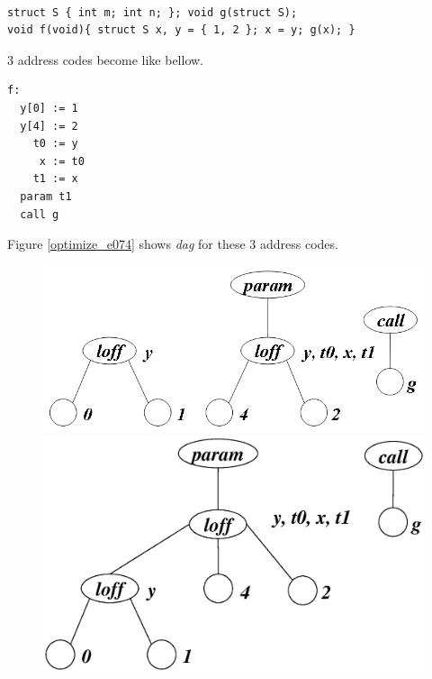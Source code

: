 \begin{Example}
\label{optimize_e073}
\begin{verbatim}

struct S { int m; int n; }; void g(struct S);
void f(void){ struct S x, y = { 1, 2 }; x = y; g(x); }
\end{verbatim}
3 address codes become like bellow.
\begin{verbatim}
f:
  y[0] := 1
  y[4] := 2
    t0 := y
     x := t0
    t1 := x
  param t1
  call g
\end{verbatim}
Figure \ref{optimize_e074} shows {\em dag} for these 3 address codes.
\begin{figure}[htbp]
\begin{center}
\begin{htmlonly}
\includegraphics[width=1.0\linewidth,height=0.439\linewidth]{opt030.png}
\end{htmlonly}
\begin{latexonly}
\includegraphics[width=1.2\linewidth,height=1.0\linewidth]{opt030.eps}

\end{latexonly}
\end{center}
\end{figure}
\end{Example}
